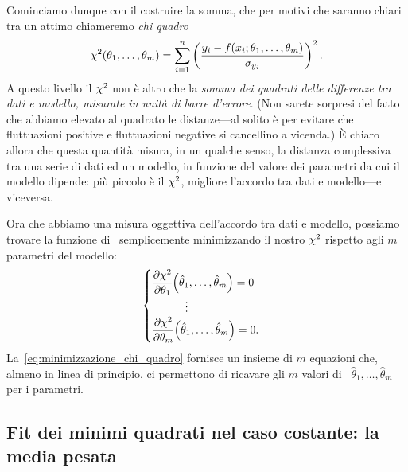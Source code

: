 Cominciamo dunque con il costruire la somma, che per motivi che saranno chiari
tra un attimo chiameremo \emph{chi quadro}
\begin{align}\label{eq:somma_chiquadro_fit}
  \chisquare{\theta_1,\ldots,\theta_m} = \sum_{i = 1}^{n}\left(
  \frac{y_i - f(x_i; \theta_1,\ldots,\theta_m)}{\sigma_{y_i}}
  \right)^2.
\end{align}
A questo livello il $\chi^2$ non è altro che la \emph{somma dei quadrati
  delle differenze tra dati e modello, misurate in unità di barre d'errore}.
(Non sarete sorpresi del fatto che abbiamo elevato al quadrato le distanze---al
solito è per evitare che fluttuazioni positive e fluttuazioni negative si
cancellino a vicenda.) \`E chiaro allora che questa quantità misura, in un
qualche senso, la distanza complessiva tra una serie di dati ed un modello, in
funzione del valore dei parametri da cui il modello dipende: più piccolo è
il $\chi^2$, migliore l'accordo tra dati e modello---e viceversa.

Ora che abbiamo una misura oggettiva dell'accordo tra dati e modello, possiamo
trovare la funzione di \bestfit\ semplicemente minimizzando il nostro
$\chi^2$ rispetto agli $m$ parametri del modello:
\begin{align}\label{eq:minimizzazione_chi_quadro}
  \begin{cases}
    \pd{\chisq}{\theta_1}{\hat{\theta}_1,\ldots,\hat{\theta}_m} = 0\\
    \hspace*{30pt}\vdots \\
    \pd{\chisq}{\theta_m}{\hat{\theta}_1,\ldots,\hat{\theta}_m} = 0.\\
   \end{cases}
\end{align}
La~\eqref{eq:minimizzazione_chi_quadro} fornisce un insieme di $m$ equazioni
che, almeno in linea di principio, ci permettono di ricavare gli $m$ valori
di \bestfit\ $\hat{\theta}_1,\ldots,\hat{\theta}_m$ per i parametri.


\subsection{Fit dei minimi quadrati nel caso costante: la media pesata}
\label{sec:media_pesata}

